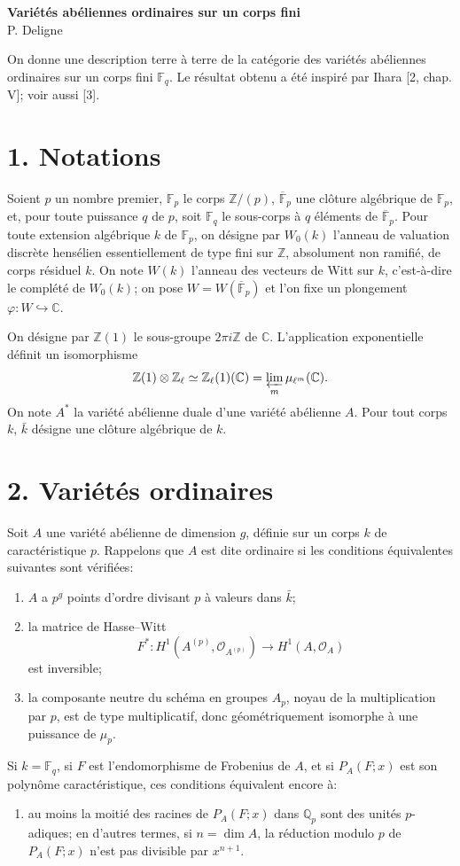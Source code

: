 \documentclass[12pt]{article}
\newcommand{\Z}{\mathbb{Z}}
\newcommand{\Q}{\mathbb{Q}}
\newcommand{\C}{\mathbb{C}}
\newcommand{\F}{\mathbb{F}}
\newcommand{\calO}{\mathcal{O}}
\theoremstyle{plain}
\theoremstyle{definition}
\theoremstyle{remark}
\begin{document}
\begin{center}
{\Large\bfseries Variétés abéliennes ordinaires sur un corps fini}\\[0.8em]
{\large P. Deligne}
\end{center}
\vspace{1em}

On donne une description terre à terre de la catégorie des variétés abéliennes ordinaires sur un corps fini $\F_q$. Le résultat obtenu a été inspiré par Ihara [2, chap. V]; voir aussi [3].

\section*{1. Notations}
Soient $p$ un nombre premier, $\F_p$ le corps $\Z/(p)$, $\overline{\F}_p$ une clôture algébrique de $\F_p$, et, pour toute puissance $q$ de $p$, soit $\F_q$ le sous-corps à $q$ éléments de $\overline{\F}_p$. Pour toute extension algébrique $k$ de $\F_p$, on désigne par $W_0(k)$ l'anneau de valuation discrète hensélien essentiellement de type fini sur $\Z$, absolument non ramifié, de corps résiduel $k$. On note $W(k)$ l'anneau des vecteurs de Witt sur $k$, c'est-à-dire le complété de $W_0(k)$; on pose $W=W(\overline{\F}_p)$ et l'on fixe un plongement $\varphi:W\hookrightarrow\C$.

On désigne par $\Z(1)$ le sous-groupe $2\pi i\Z$ de $\C$. L'application exponentielle définit un isomorphisme
\[
 \Z(1)\otimes\Z_\ell \simeq \Z_\ell(1)(\C)=\varprojlim_m \mu_{\ell^m}(\C).
\]
On note $A^*$ la variété abélienne duale d'une variété abélienne $A$. Pour tout corps $k$, $\bar k$ désigne une clôture algébrique de $k$.

\section*{2. Variétés ordinaires}
Soit $A$ une variété abélienne de dimension $g$, définie sur un corps $k$ de caractéristique $p$. Rappelons que $A$ est dite ordinaire si les conditions équivalentes suivantes sont vérifiées:
\begin{enumerate}[label=(\Roman*)]
\item $A$ a $p^g$ points d'ordre divisant $p$ à valeurs dans $\bar k$;
\item la matrice de Hasse--Witt
\[
 F^*:H^1(A^{(p)},\calO_{A^{(p)}})\longrightarrow H^1(A,\calO_A)
\]
est inversible;
\item la composante neutre du schéma en groupes $A_p$, noyau de la multiplication par $p$, est de type multiplicatif, donc géométriquement isomorphe à une puissance de $\mu_p$.
\end{enumerate}
Si $k=\F_q$, si $F$ est l'endomorphisme de Frobenius de $A$, et si $P_A(F;x)$ est son polynôme caractéristique, ces conditions équivalent encore à:
\begin{enumerate}[label=(\Roman*),start=4]
\item au moins la moitié des racines de $P_A(F;x)$ dans $\Q_p$ sont des unités $p$-adiques; en d'autres termes, si $n=\dim A$, la réduction modulo $p$ de $P_A(F;x)$ n'est pas divisible par $x^{n+1}$.
\end{enumerate}
\end{document}

